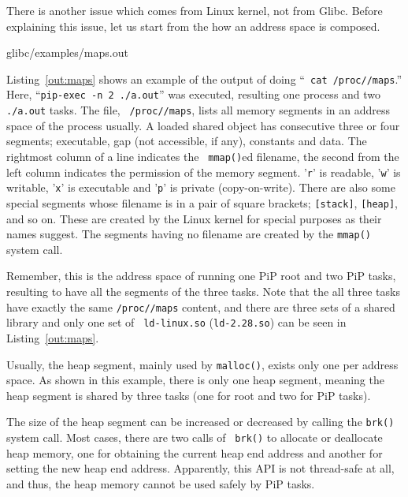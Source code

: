 
There is another issue which comes from Linux kernel, not from
Glibc. Before explaining this issue, let us start from the how an
address space is composed. 

 {glibc/examples/maps.out}

Listing~\ref{out:maps} shows an example of the output of doing ``{\tt
  cat /proc//maps}.'' Here, ``{\tt pip-exec -n 2
  ./a.out}'' was executed, resulting one  process
and two {\tt ./a.out} tasks. The file, {\tt
  /proc//maps}, lists all memory
segments in an address space of the process {\tt {}}
usually. A loaded shared object has consecutive three or four segments; 
executable, gap (not accessible, if any), constants and data. 
The rightmost column of a line indicates the {\tt
  mmap()}ed filename, the second from the left column indicates the
permission of the memory segment. '{\tt r}' is readable, '{\tt w}' is
writable, '{\tt x}' is executable and '{\tt p}' is private
(copy-on-write). There are also some special segments whose filename
is in a pair of square brackets; {\tt [stack]}, {\tt [heap]}, and so
on. These are created by the Linux kernel for special purposes as
their names suggest. The segments having no filename are created by
the {\tt mmap()} system call. 

Remember, this is the address space of running one PiP root and two PiP
tasks, resulting to have all the segments of the three tasks.
Note that the all three tasks have
exactly the same {\tt /proc//maps} content, and
there are three sets of a shared library and only one set of {\tt
  ld-linux.so} ({\tt ld-2.28.so}) can be seen in
Listing~\ref{out:maps}.

Usually, the heap segment, mainly used by {\tt malloc()}, exists only
one per address space. As shown in this example, there is only one heap
segment, meaning the heap segment is shared by three tasks (one for
root and two for PiP tasks). 

The size of the heap segment can be increased or decreased by calling
the {\tt brk()} system call. Most cases, there are two calls of {\tt
  brk()} to allocate or deallocate heap memory, one for obtaining the
current heap end address and another for setting the new heap end 
address. Apparently, this API is not thread-safe at all, and thus,
the heap memory cannot be used safely by PiP tasks.


